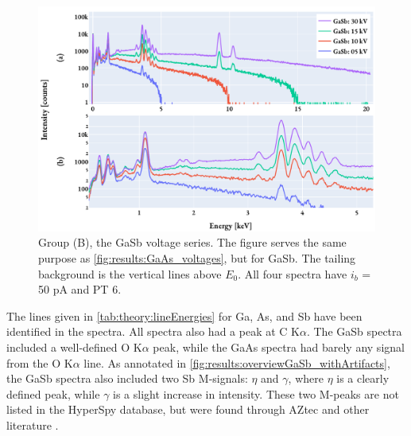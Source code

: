 \begin{figure}[hbtp]
    \centering
    \includegraphics[width=0.85\linewidth]{figures/results/GaSb_voltages.pdf}
    \caption{
        Group (B), the GaSb voltage series.
        The figure serves the same purpose as \cref{fig:results:GaAs_voltages}, but for GaSb.
        The tailing background is the vertical lines above $E_0$.
        All four spectra have $i_b$ = 50 pA and PT 6.
    }
    \label{fig:results:GaSb_voltages}
\end{figure}




The lines given in \cref{tab:theory:lineEnergies} for Ga, As, and Sb have been identified in the spectra.
All spectra also had a peak at C K$\alpha$.
The GaSb spectra included a well-defined O K$\alpha$ peak, while the GaAs spectra had barely any signal from the O K$\alpha$ line.
As annotated in \cref{fig:results:overviewGaSb_withArtifacts}, the GaSb spectra also included two Sb M-signals: $\eta$ and $\gamma$, where $\eta$ is a clearly defined peak, while $\gamma$ is a slight increase in intensity.
These two M-peaks are not listed in the HyperSpy database, but were found through AZtec \cite{aztec_manual} and other literature \cite{liao2006practical}.




